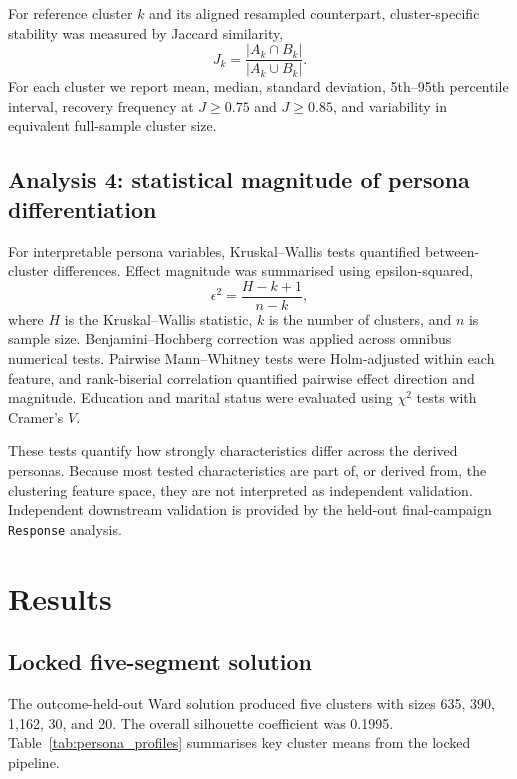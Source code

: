 \documentclass[10pt]{article}
\begin{document}
For reference cluster $k$ and its aligned resampled counterpart, cluster-specific stability was measured by Jaccard similarity,
\begin{equation}
J_k=\frac{|A_k\cap B_k|}{|A_k\cup B_k|}.
\end{equation}
For each cluster we report mean, median, standard deviation, 5th--95th percentile interval, recovery frequency at $J\geq0.75$ and $J\geq0.85$, and variability in equivalent full-sample cluster size.

\subsection{Analysis 4: statistical magnitude of persona differentiation}
For interpretable persona variables, Kruskal--Wallis tests quantified between-cluster differences. Effect magnitude was summarised using epsilon-squared,
\begin{equation}
\epsilon^2=\frac{H-k+1}{n-k},
\end{equation}
where $H$ is the Kruskal--Wallis statistic, $k$ is the number of clusters, and $n$ is sample size. Benjamini--Hochberg correction was applied across omnibus numerical tests. Pairwise Mann--Whitney tests were Holm-adjusted within each feature, and rank-biserial correlation quantified pairwise effect direction and magnitude. Education and marital status were evaluated using $\chi^2$ tests with Cramer's $V$.

These tests quantify how strongly characteristics differ across the derived personas. Because most tested characteristics are part of, or derived from, the clustering feature space, they are not interpreted as independent validation. Independent downstream validation is provided by the held-out final-campaign \texttt{Response} analysis.

\section{Results}
\subsection{Locked five-segment solution}
The outcome-held-out Ward solution produced five clusters with sizes 635, 390, 1,162, 30, and 20. The overall silhouette coefficient was 0.1995. Table~\ref{tab:persona_profiles} summarises key cluster means from the locked pipeline.
\end{document}
